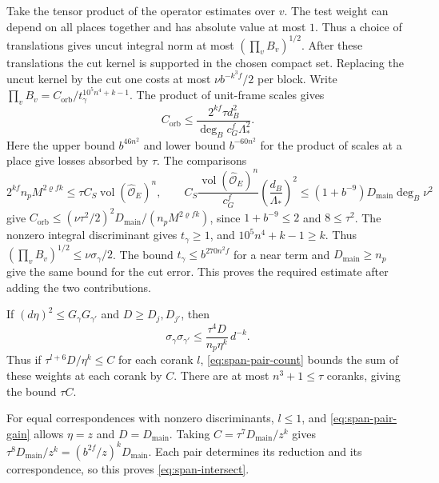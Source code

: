 Take the tensor product of the operator estimates over \(v\).
The test weight can depend on all places together and has absolute
value at most \(1\). Thus a choice of translations gives uncut integral
norm at most \((\prod_v B_v)^{1/2}\).
After these translations the cut kernel is supported in the chosen
compact set. Replacing the uncut kernel by the cut one costs at most
\(\nu b^{-k^3f}/2\) per block.
Write \(\prod_v B_v=C_{\mathrm{orb}}/t_\gamma^{10^5n^4+k-1}\).
The product of unit-frame scales gives
\[
 C_{\mathrm{orb}}\le
 \frac{2^{kf}\tau d_B^2}{\deg_B c_G^f\Lambda_\ast^2}.
\]
Here the upper bound \(b^{46n^2}\) and lower bound \(b^{-60n^2}\)
for the product of scales at a place give losses absorbed by \(\tau\).
The comparisons
\[
 2^{kf}n_pM^{2\varrho fk}
 \le\tau C_S\operatorname{vol}(\widehat{\mathcal O}_E)^n,\qquad
 C_S\frac{\operatorname{vol}(\widehat{\mathcal O}_E)^n}{c_G^f}
     \left(\frac{d_B}{\Lambda_\ast}\right)^2
 \le(1+b^{-9})D_{\mathrm{main}}\deg_B\nu^2
\]
give \(C_{\mathrm{orb}}\le(\nu\tau^2/2)^2
D_{\mathrm{main}}/(n_pM^{2\varrho fk})\), since \(1+b^{-9}\le2\)
and \(8\le\tau^2\). The nonzero integral discriminant gives
\(t_\gamma\ge1\), and \(10^5n^4+k-1\ge k\).
Thus \((\prod_v B_v)^{1/2}\le\nu\sigma_\gamma/2\).
The bound \(t_\gamma\le b^{270n^2f}\) for a near term and
\(D_{\mathrm{main}}\ge n_p\) give the same bound for the cut error.
This proves the required estimate after adding the two contributions.

If \((d\eta)^2\le G_\gamma G_{\gamma'}\) and \(D\ge D_j,D_{j'}\), then
\[
 \sigma_\gamma\sigma_{\gamma'}
 \le \frac{\tau^4D}{n_p\eta^k}\,d^{-k}.
\]
Thus if \(\tau^{l+6}D/\eta^k\le C\) for each corank \(l\),
\eqref{eq:span-pair-count} bounds the sum of these weights at each corank
by \(C\). There are at most \(n^3+1\le\tau\) coranks, giving the bound \(\tau C\).

For equal correspondences with nonzero discriminants, \(l\le1\), and
\eqref{eq:span-pair-gain} allows \(\eta=z\) and \(D=D_{\mathrm{main}}\).
Taking \(C=\tau^7D_{\mathrm{main}}/z^k\) gives
\(\tau^8D_{\mathrm{main}}/z^k=(b^{2f}/z)^kD_{\mathrm{main}}\).
Each pair determines its reduction and its correspondence, so this
proves \eqref{eq:span-intersect}.

